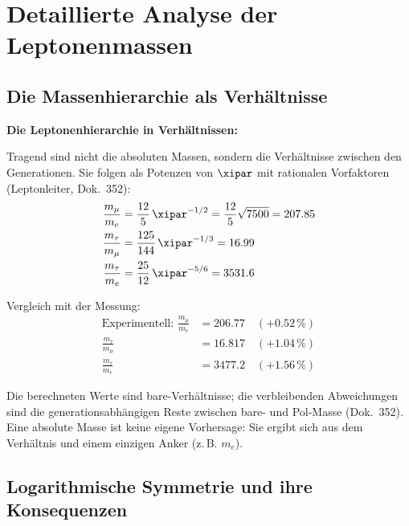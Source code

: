 	\section{Detaillierte Analyse der Leptonenmassen}
	
	\subsection{Die Massenhierarchie als Verhältnisse}
	
	\begin{beziehung}
		\textbf{Die Leptonenhierarchie in Verhältnissen:}
		
		Tragend sind nicht die absoluten Massen, sondern die Verhältnisse zwischen den Generationen. Sie folgen als Potenzen von $\xipar$ mit rationalen Vorfaktoren (Leptonleiter, Dok.~352):
		\begin{align}
			\frac{m_\mu}{m_e} &= \frac{12}{5}\,\xipar^{-1/2} = \frac{12}{5}\sqrt{7500} = 207.85 \\
			\frac{m_\tau}{m_\mu} &= \frac{125}{144}\,\xipar^{-1/3} = 16.99 \\
			\frac{m_\tau}{m_e} &= \frac{25}{12}\,\xipar^{-5/6} = 3531.6
		\end{align}
		
		Vergleich mit der Messung:
		\begin{align}
			\text{Experimentell: } \frac{m_\mu}{m_e} &= 206.77 \quad (+0.52\,\%) \\
			\frac{m_\tau}{m_\mu} &= 16.817 \quad (+1.04\,\%) \\
			\frac{m_\tau}{m_e} &= 3477.2 \quad (+1.56\,\%)
		\end{align}
		
		Die berechneten Werte sind bare-Verhältnisse; die verbleibenden Abweichungen sind die generationsabhängigen Reste zwischen bare- und Pol-Masse (Dok.~352). Eine absolute Masse ist keine eigene Vorhersage: Sie ergibt sich aus dem Verhältnis und einem einzigen Anker (z.\,B. $m_e$).
		
	\end{beziehung}
	
	\subsection{Logarithmische Symmetrie und ihre Konsequenzen}
	
